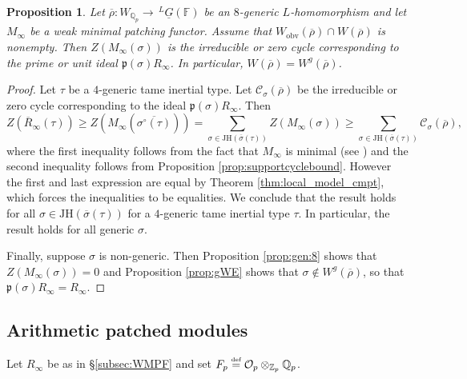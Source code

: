 \documentclass[oneside,a4paper,english, 11pt]{amsart}
\theoremstyle{plain}
\theoremstyle{plain}
\newtheorem{prop}[thm]{Proposition}
\theoremstyle{plain}
\theoremstyle{plain}
\theoremstyle{plain}
\theoremstyle{plain}
\theoremstyle{definition}
\theoremstyle{definition}
\theoremstyle{definition}
\theoremstyle{remark}
\numberwithin{equation}{section}
\newcommand{\Q}{\mathbb{Q}}
\newcommand{\Qp}{\mathbb{Q}_p}
\newcommand{\F}{\mathbb{F}}
\newcommand{\fp}{\mathfrak{p}}
\newcommand{\cC}{\mathcal{C}}
\newcommand{\cO}{\mathcal{O}}
\newcommand{\Zp}{\mathbb{Z}_p}
\newcommand{\un}[1]{\underline{#1}}
\newcommand{\JH}{\mathrm{JH}}
\newcommand{\rhobar}{\overline{\rho}}
\newcommand{\defeq}{\stackrel{\textrm{\tiny{def}}}{=}}
\newcommand{\ovl}[1]{\overline{#1}}
\newcommand{\obv}{\mathrm{obv}}
\newcommand{\ra}{\rightarrow}
\begin{document}
\begin{prop}\label{prop:minimalcycle}
Let $\rhobar: W_{\Q_p} \ra \, ^L \un{G}(\F)$ be an $8$-generic $L$-homomorphism and let $M_\infty$ be a weak minimal patching functor. 
Assume that $W_{\obv}(\rhobar)\cap W(\rhobar)$ is nonempty.
Then $Z(M_\infty(\sigma))$ is the irreducible or zero cycle corresponding to the prime or unit ideal $\fp(\sigma)R_\infty$. In particular, $W(\rhobar) = W^g(\rhobar)$.
\end{prop}
\begin{proof} 
Let $\tau$ be a $4$-generic tame inertial type. 
Let $\cC_\sigma(\rhobar)$ be the irreducible or zero cycle corresponding to the ideal $\fp(\sigma) R_\infty$. 
Then 
\[
Z(\ovl{R}_\infty(\tau)) \geq Z(M_\infty(\ovl{\sigma^\circ(\tau)})) = \sum_{\sigma \in \JH(\ovl{\sigma}(\tau))} Z(M_\infty(\sigma)) \geq \sum_{\sigma \in \JH(\ovl{\sigma}(\tau))} \cC_\sigma(\rhobar),
\]
where the first inequality follows from the fact that $M_\infty$ is minimal (see \cite{LLLM}) and the second inequality follows from Proposition \ref{prop:supportcyclebound}. 
However the first and last expression are equal by Theorem \ref{thm:local_model_cmpt}, which forces the inequalities to be equalities. 
We conclude that the result holds for all $\sigma \in \JH(\ovl{\sigma}(\tau))$ for a $4$-generic tame inertial type $\tau$. 
In particular, the result holds for all generic $\sigma$. 

Finally, suppose $\sigma$ is non-generic. 
Then Proposition \ref{prop:gen:8} shows that $Z(M_\infty(\sigma))=0$ and Proposition \ref{prop:gWE} shows that $\sigma \notin W^g(\rhobar)$, so that $\fp(\sigma)R_\infty = R_\infty$.
%
%
%
%
%
%
\end{proof}


\subsection{Arithmetic patched modules}
\label{subsec:AM}


Let $R_\infty$ be as in \S \ref{subsec:WMPF} and set $F_p\defeq \cO_p\otimes_{\Zp}\Qp$.
\end{document}
